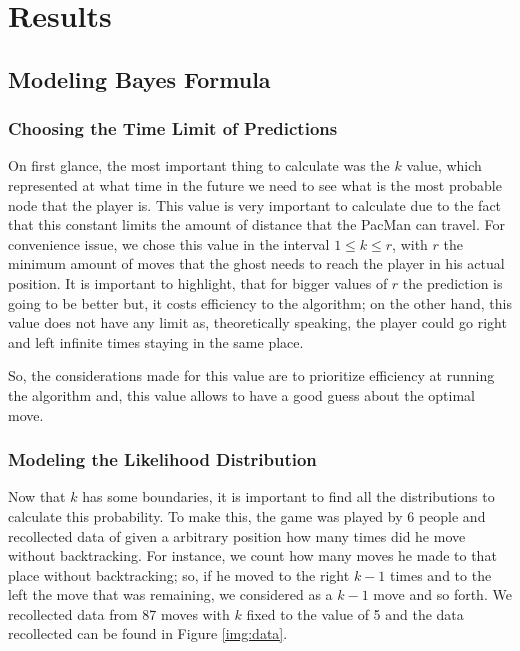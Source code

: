 \section{Results}
\subsection{Modeling Bayes Formula}
\subsubsection{Choosing the Time Limit of Predictions}
On first glance, the most important thing to calculate was the $k$ value, which represented at what time in the future we need to see what is the most probable node that the player is. This value is very important to calculate due to the fact that this constant limits the amount of distance that the PacMan can travel. For convenience issue, we chose this value in the interval $1 \le k \le r$, with $r$ the minimum amount of moves that the ghost needs to reach the player in his actual position. It is important to highlight, that for bigger values of $r$ the prediction is going to be better but, it costs efficiency to the algorithm; on the other hand, this value does not have any limit as, theoretically speaking, the player could go right and left infinite times staying in the same place.

So, the considerations made for this value are to prioritize efficiency at running the algorithm and, this value allows to have a good guess about the optimal move.

\subsubsection{Modeling the Likelihood Distribution}
Now that $k$ has some boundaries, it is important to find all the distributions to calculate this probability. To make this, the game was played by 6 people and recollected data of given a arbitrary position how many times did he move without backtracking. For instance, we count how many moves he made to that place without backtracking; so, if he moved to the right $k-1$ times and to the left the move that was remaining, we considered as a $k-1$ move and so forth. We recollected data from 87 moves with $k$ fixed to the value of 5 and the data recollected can be found in Figure \ref{img:data}.

